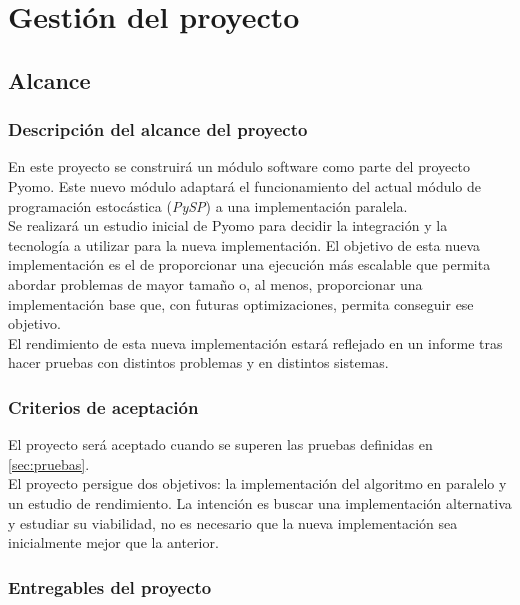 \chapter{Gestión del proyecto}

\section{Alcance}

\subsection{Descripción del alcance del proyecto}

En este proyecto se construirá un módulo software como parte del proyecto Pyomo. Este nuevo módulo adaptará el funcionamiento del actual módulo de programación estocástica (\textit{PySP}) a una implementación paralela.\\

Se realizará un estudio inicial de Pyomo para decidir la integración y la tecnología a utilizar para la nueva implementación. El objetivo de esta nueva implementación es el de proporcionar una ejecución más escalable que permita abordar problemas de mayor tamaño o, al menos, proporcionar una implementación base que, con futuras optimizaciones, permita conseguir ese objetivo.\\

El rendimiento de esta nueva implementación estará reflejado en un informe tras hacer pruebas con distintos problemas y en distintos sistemas.

\subsection{Criterios de aceptación}

El proyecto será aceptado cuando se superen las pruebas definidas en \autoref{sec:pruebas}.\\

El proyecto persigue dos objetivos: la implementación del algoritmo en paralelo y un estudio de rendimiento. La intención es buscar una implementación alternativa y estudiar su viabilidad, no es necesario que la nueva implementación sea inicialmente mejor que la anterior.

\subsection{Entregables del proyecto}

